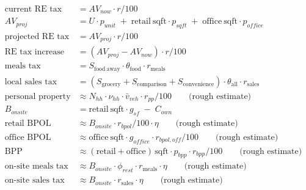 \documentclass[11pt]{article}
\begin{document}
\begin{align}
\text{current RE tax} &= AV_{now} \cdot r / 100 \\
AV_{proj} &= U \cdot p_{unit} \;+\; \mathrm{retail\ sqft} \cdot p_{sqft}
             \;+\; \mathrm{office\ sqft} \cdot p_{office} \\
\text{projected RE tax} &= AV_{proj} \cdot r / 100 \\
\text{RE tax increase} &= (AV_{proj} - AV_{now}) \cdot r / 100 \\
\text{meals tax} &= S_{\mathrm{food\ away}} \cdot \theta_{\mathrm{food}} \cdot r_{\mathrm{meals}} \\
\text{local sales tax} &= \left( S_{\mathrm{grocery}} + S_{\mathrm{comparison}}
                          + S_{\mathrm{convenience}} \right) \cdot \theta_{\mathrm{all}}
                          \cdot r_{\mathrm{sales}} \\
\text{personal property} &\approx N_{hh} \cdot \nu_{hh} \cdot \bar{v}_{veh}
                          \cdot r_{pp} / 100
    \qquad \text{(rough estimate)} \label{eq:ppest} \\
B_{onsite} &= \mathrm{retail\ sqft} \cdot g_{sf} \;-\; C_{own}
    \label{eq:onsitebase} \\
\text{retail BPOL} &\approx B_{onsite} \cdot r_{bpol} / 100 \cdot \eta
    \qquad \text{(rough estimate)} \label{eq:bpolest} \\
\text{office BPOL} &\approx \mathrm{office\ sqft} \cdot g_{office}
                      \cdot r_{bpol,off} / 100
    \qquad \text{(rough estimate)} \\
\text{BPP} &\approx (\mathrm{retail} + \mathrm{office})\,\mathrm{sqft}
              \cdot p_{bpp} \cdot r_{bpp} / 100
    \qquad \text{(rough estimate)} \\
\text{on-site meals tax} &\approx B_{onsite} \cdot \phi_{rest}
                            \cdot r_{\mathrm{meals}} \cdot \eta
    \qquad \text{(rough estimate)} \\
\text{on-site sales tax} &\approx B_{onsite} \cdot r_{\mathrm{sales}} \cdot \eta
    \qquad \text{(rough estimate)}
\end{align}
\end{document}
